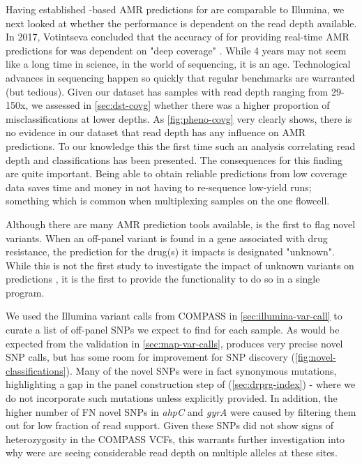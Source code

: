 \noindent
Having established \ont{}-based AMR predictions for \mtb{} are comparable to Illumina, we next looked at whether the \ont{} performance is dependent on the read depth available. In 2017, Votintseva \etal{} concluded that the accuracy of \ont{} for providing real-time AMR predictions for \mtb{} was dependent on "deep coverage" \cite{Votintseva2017}. While 4 years may not seem like a long time in science, in the world of \ont{} sequencing, it is an age. Technological advances in \ont{} sequencing happen so quickly that regular benchmarks are warranted (but tedious). Given our dataset has samples with read depth ranging from 29-150x, we assessed in \autoref{sec:dst-covg} whether there was a higher proportion of misclassifications at lower depths. As \autoref{fig:pheno-covg} very clearly shows, there is no evidence in our dataset that read depth has any influence on AMR predictions. To our knowledge this the first time such an analysis correlating read depth and classifications has been presented. The consequences for this finding are quite important. Being able to obtain reliable predictions from low coverage data saves time and money in not having to re-sequence low-yield \ont{} runs; something which is common when multiplexing samples on the one flowcell.

\noindent
Although there are many \mtb{} AMR prediction tools available, \drprg{} is the first to flag novel variants. When an off-panel variant is found in a gene associated with drug resistance, the prediction for the drug(s) it impacts is designated "unknown". While this is not the first study to investigate the impact of unknown variants on predictions \cite{cryptic2018,hunt2019}, it is the first to provide the functionality to do so in a single program.

We used the Illumina variant calls from COMPASS in \autoref{sec:illumina-var-call} to curate a list of off-panel SNPs we expect to find for each sample. As would be expected from the \pandora{} validation in \autoref{sec:map-var-calls}, \drprg{} produces very precise novel SNP calls, but has some room for improvement for SNP discovery (\autoref{fig:novel-classifications}). Many of the novel SNPs were in fact synonymous mutations, highlighting a gap in the panel construction step of \drprg{} (\autoref{sec:drprg-index}) - where we do not incorporate such mutations unless explicitly provided. In addition, the higher number of FN novel SNPs in \textit{ahpC} and \textit{gyrA} were caused by \drprg{} filtering them out for low fraction of read support. Given these SNPs did not show signs of heterozygosity in the COMPASS VCFs, this warrants further investigation into why were are seeing considerable read depth on multiple alleles at these sites.


